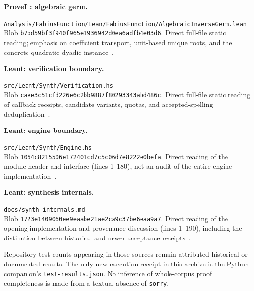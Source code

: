 \documentclass[11pt,letterpaper]{article}
\newcommand{\code}[1]{\nolinkurl{#1}}
\theoremstyle{definition}
\theoremstyle{remark}
\begin{document}
\textbf{ProveIt: algebraic germ.}\par
\code{Analysis/FabiusFunction/Lean/FabiusFunction/AlgebraicInverseGerm.lean}\\
Blob \code{b7bd59bf3f940f965e1936942d0ea6adfb4e03d6}. Direct full-file static
reading; emphasis on coefficient transport, unit-based unique roots, and the
concrete quadratic dyadic instance~\cite{p-germ}.

\textbf{Leant: verification boundary.}\par
\code{src/Leant/Synth/Verification.hs}\\
Blob \code{caee3c51cfd226e6c2bb9887f80293343abd486c}. Direct full-file static
reading of callback receipts, candidate variants, quotas, and accepted-spelling
deduplication~\cite{l-verify}.

\textbf{Leant: engine boundary.}\par
\code{src/Leant/Synth/Engine.hs}\\
Blob \code{1064c8215506e172401cd7c5c06d7e8222e0befa}. Direct reading of the
module header and interface (lines 1--180), not an audit of the entire engine
implementation~\cite{leant-engine}.

\textbf{Leant: synthesis internals.}\par
\code{docs/synth-internals.md}\\
Blob \code{1723e1409060ee9eaabe21ae2ca9c37be6eaa9a7}. Direct reading of the
opening implementation and provenance discussion (lines 1--190), including the
distinction between historical and newer acceptance receipts~\cite{l-internals}.


Repository test counts appearing in those sources remain attributed historical
or documented results. The only new execution receipt in this archive is the
Python companion's \code{test-results.json}. No inference of whole-corpus proof
completeness is made from a textual absence of \code{sorry}.
\end{document}
